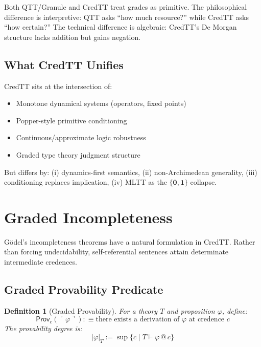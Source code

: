 \documentclass[11pt,a4paper]{article}
\makeatletter
\newtheorem{definition}{Definition}[section]
\newcommand{\at}[1]{\,@\,#1}
\newcommand{\one}{\mathbf{1}}
\newcommand{\zero}{\mathbf{0}}
\makeatother
\begin{document}
Both QTT/Granule and CredTT treat grades as primitive. The philosophical difference is interpretive: QTT asks ``how much resource?'' while CredTT asks ``how certain?'' The technical difference is algebraic: CredTT's De Morgan structure lacks addition but gains negation.

\subsection{What CredTT Unifies}

CredTT sits at the intersection of:
\begin{itemize}
    \item Monotone dynamical systems (operators, fixed points)
    \item Popper-style primitive conditioning
    \item Continuous/approximate logic robustness
    \item Graded type theory judgment structure
\end{itemize}

But differs by: (i) dynamics-first semantics, (ii) non-Archimedean generality, (iii) conditioning replaces implication, (iv) MLTT as the $\{\zero,\one\}$ collapse.

\section{Graded Incompleteness}

G\"odel's incompleteness theorems have a natural formulation in CredTT. Rather than forcing undecidability, self-referential sentences attain determinate intermediate credences.

\subsection{Graded Provability Predicate}

\begin{definition}[Graded Provability]
For a theory $T$ and proposition $\varphi$, define:
\[
\mathsf{Prov}_c(\ulcorner \varphi \urcorner) :\equiv \text{there exists a derivation of } \varphi \text{ at credence } c
\]
The \emph{provability degree} is:
\[
|\varphi|_T := \sup\{c \mid T \vdash \varphi \at{c}\}
\]
\end{definition}
\end{document}
